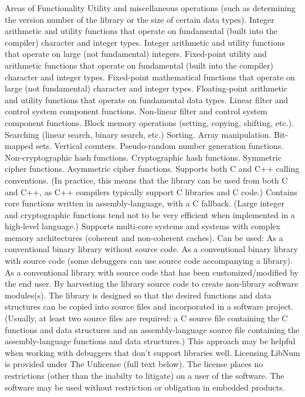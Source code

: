 Areas of Functionality
Utility and miscellaneous operations (such as determining the version number of the library or the size of certain data types).
Integer arithmetic and utility functions that operate on fundamental (built into the compiler) character and integer types.
Integer arithmetic and utility functions that operate on large (not fundamental) integers.
Fixed-point utility and arithmetic functions that operate on fundamental (built into the compiler) character and integer types.
Fixed-point mathematical functions that operate on large (not fundamental) character and integer types.
Floating-point arithmetic and utility functions that operate on fundamental data types.
Linear filter and control system component functions.
Non-linear filter and control system component functions.
Block memory operations (setting, copying, shifting, etc.).
Searching (linear search, binary search, etc.)
Sorting.
Array manipulation.
Bit-mapped sets.
Vertical counters.
Pseudo-random number generation functions.
Non-cryptographic hash functions.
Cryptographic hash functions.
Symmetric cipher functions.
Asymmetric cipher functions.
Supports both C and C++ calling conventions.
(In practice, this means that the library can be used from both C and C++, as C++ compilers typically support C libraries and C code.)
Contains core functions written in assembly-language, with a C fallback. (Large integer and cryptographic functions tend not to be very efficient when implemented in a high-level language.)
Supports multi-core systems and systems with complex memory architectures (coherent and non-coherent caches).
Can be used:
As a conventional binary library without source code.
As a conventional binary library with source code (some debuggers can use source code accompanying a library).
As a conventional library with source code that has been customized/modified by the end user.
By harvesting the library source code to create non-library software modules(s).
The library is designed so that the desired functions and data structures can be copied into source files and incorporated in a software project. (Usually, at least two source files are required: a C source file containing the C functions and data structures and an assembly-language source file containing the assembly-language functions and data structures.)
This approach may be helpful when working with debuggers that don't support libraries well.
Licensing
LibNum is provided under The Unlicense (full text below). The license places no restrictions (other than the inabilty to litigate) on a user of the software. The software may be used without restriction or obligation in embedded products.

